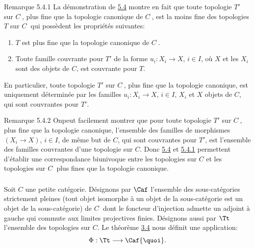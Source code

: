 \begin{enonce*}[remark]{Remarque 5.4.1}
La démonstration de \hyperref[II.prop5.4]{5.4} montre en fait que toute
topologie $T'$ sur $C^{\widehat{\phantom{,}}}$, plus fine que la
topologie canonique de $C^{\widehat{\phantom{,}}}$, est la moins
fine des topologies $T$ sur $C^{\widehat{\phantom{,}}}$ qui
possèdent les propriétés suivantes:
\begin{enumerate}
\renewcommand{\theenumi}{\alph{enumi}}
\renewcommand{\labelenumi}{\theenumi)}
\item $T$ est plus fine que la topologie canonique de
  $C^{\widehat{\phantom{,}}}$.

\item Toute famille couvrante pour $T'$ de la forme
  $u_i:X_i\rightarrow X$, $i\in I$, où $X$ et les $X_i$ sont des
  objets de $C$, est couvrante pour $T$.
\end{enumerate}
\end{enonce*}

En particulier, toute topologie $T'$ sur
$C^{\widehat{\phantom{,}}}$, plus fine que la topologie canonique,
est uniquement déterminée par les familles $u_i:X_i\rightarrow
X$, $i\in I$, $X_i$ et $X$ objets de $C$, qui sont couvrantes pour
$T'$.

\begin{enonce*}[remark]{Remarque 5.4.2}
On\pageoriginale peut facilement montrer que pour toute topologie
$T'$ sur $C^{\widehat{\phantom{,}}}$, plus fine que la topologie
canonique, l'ensemble des familles de morphismes $(X_i\rightarrow
X)$, $i\in I$, de même but de $C$, qui sont couvrantes pour $T'$,
est l'ensemble des familles couvrantes d'une topologie sur $C$. Donc
\hyperref[II.prop5.4]{5.4} et \hyperref[II.rem5.4.1]{5.4.1} permettent d'établir une
correspondance biunivoque entre les topologies sur $C$ et les
topologies sur $C^{\widehat{\phantom{,}}}$ plus fines que la
topologie canonique.
\end{enonce*}

\setcounter{subsection}{5} \setcounter{subsubsection}{-1}
\subsubsection{}
Soit $C$ une petite catégorie. Désignons par $\Caf$ l'ensemble des
sous-catégories strictement pleines (tout objet isomorphe à un objet
de la sous-catégorie est un objet de la sous-catégorie) de
$C^{\widehat{\phantom{,}}}$ dont le foncteur d'injection admette un
adjoint à gauche qui commute aux limites projectives finies.
Désignons aussi par $\Tt$ l'ensemble des topologies sur $C$. Le
théorème \hyperref[II.theo3.4]{3.4} nous définit une application:
$$
\Phi:\Tt\longrightarrow \Caf{\quoi}.
$$

